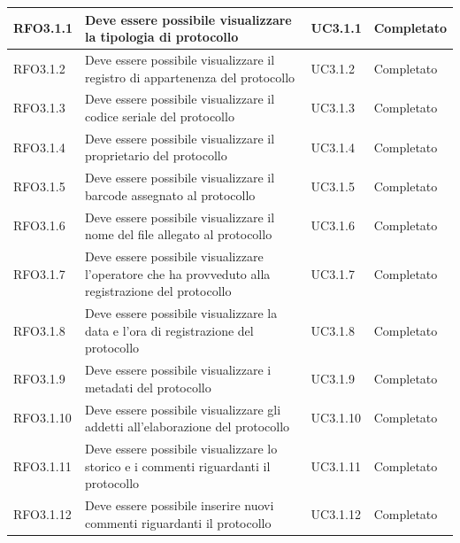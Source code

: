 \begin{longtable}{| p{3cm} | p{6cm} | p{3cm} | p{3cm} |}
        RFO3.1.1 & Deve essere possibile visualizzare la tipologia di protocollo & UC3.1.1 & Completato
        \\ \hline
        
        RFO3.1.2 & Deve essere possibile visualizzare il registro di appartenenza del protocollo & UC3.1.2 & Completato
        \\ \hline
        
        RFO3.1.3 & Deve essere possibile visualizzare il codice seriale del protocollo & UC3.1.3 & Completato
        \\ \hline
        
        RFO3.1.4 & Deve essere possibile visualizzare il proprietario del protocollo & UC3.1.4 & Completato
        \\ \hline
        
        RFO3.1.5 & Deve essere possibile visualizzare il barcode assegnato al protocollo & UC3.1.5 & Completato
        \\ \hline
        
        RFO3.1.6 & Deve essere possibile visualizzare il nome del file allegato al protocollo & UC3.1.6 & Completato
        \\ \hline
        
        RFO3.1.7 & Deve essere possibile visualizzare l'operatore che ha provveduto alla registrazione del protocollo & UC3.1.7 & Completato
        \\ \hline
        
        RFO3.1.8 & Deve essere possibile visualizzare la data e l'ora di registrazione del protocollo & UC3.1.8 & Completato
        \\ \hline
        
        RFO3.1.9 & Deve essere possibile visualizzare i metadati del protocollo & UC3.1.9 & Completato
        \\ \hline
        
        RFO3.1.10 & Deve essere possibile visualizzare gli addetti all'elaborazione del protocollo & UC3.1.10 & Completato
        \\ \hline
        
        RFO3.1.11 \label{RFO3.1.11} & Deve essere possibile visualizzare lo storico e i commenti riguardanti il protocollo & UC3.1.11 & Completato
        \\ \hline
        
        RFO3.1.12 & Deve essere possibile inserire nuovi commenti riguardanti il protocollo & UC3.1.12 & Completato
        \\ \hline
        

\end{longtable}
